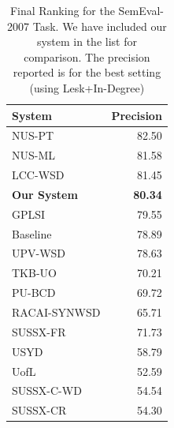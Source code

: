 \documentclass[12pt,letterpaper]{article}
\begin{document}

\begin{table}
\centering
\begin{tabular}{|l|r|}
System & Precision \\
\hline
NUS-PT & 82.50 \\
NUS-ML & 81.58 \\
LCC-WSD & 81.45 \\
\textbf{Our System} & \textbf{80.34}\\
GPLSI & 79.55 \\
Baseline & 78.89 \\
UPV-WSD & 78.63 \\
TKB-UO & 70.21 \\
PU-BCD & 69.72 \\
RACAI-SYNWSD & 65.71 \\
SUSSX-FR & 71.73 \\
USYD & 58.79 \\
UofL & 52.59 \\
SUSSX-C-WD & 54.54 \\
SUSSX-CR & 54.30 \\
\end{tabular}
\caption{Final Ranking for the SemEval-2007 Task. We have included our system in the list for comparison. The precision reported is for the best setting (using Lesk+In-Degree)}
\end{table}

\end{document}
